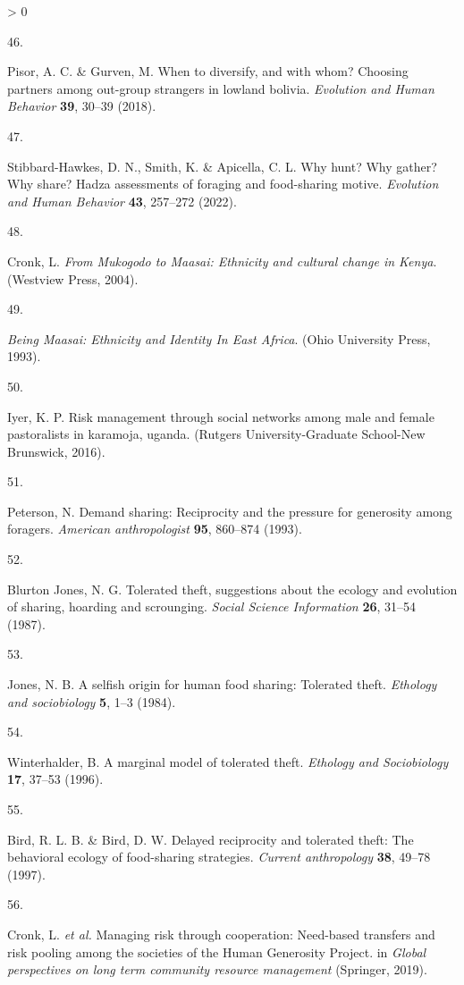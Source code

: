 \documentclass[
]{article}
\newlength{\cslhangindent}
\newlength{\csllabelwidth}
\newenvironment{CSLReferences}[2] %
 {%
  \setlength{\parindent}{0pt}
  \ifodd #1 \everypar{\setlength{\hangindent}{\cslhangindent}}\ignorespaces\fi
  \ifnum #2 > 0
  \setlength{\parskip}{#2\baselineskip}
  \fi
 }%
 {}
\newcommand{\CSLLeftMargin}[1]{\parbox[t]{\csllabelwidth}{#1}}
\newcommand{\CSLRightInline}[1]{\parbox[t]{\linewidth - \csllabelwidth}{#1}\break}
\begin{document}
\begin{CSLReferences}{0}{0}
\leavevmode\hypertarget{ref-pisor2018diversify}{}%
\CSLLeftMargin{46. }
\CSLRightInline{Pisor, A. C. \& Gurven, M. When to diversify, and with whom? Choosing partners among out-group strangers in lowland bolivia. \emph{Evolution and Human Behavior} \textbf{39}, 30--39 (2018).}

\leavevmode\hypertarget{ref-stibbard2022hunt}{}%
\CSLLeftMargin{47. }
\CSLRightInline{Stibbard-Hawkes, D. N., Smith, K. \& Apicella, C. L. Why hunt? Why gather? Why share? Hadza assessments of foraging and food-sharing motive. \emph{Evolution and Human Behavior} \textbf{43}, 257--272 (2022).}

\leavevmode\hypertarget{ref-cronkMukogodoMaasaiEthnicity2004}{}%
\CSLLeftMargin{48. }
\CSLRightInline{Cronk, L. \emph{From {Mukogodo} to {Maasai}: Ethnicity and cultural change in {Kenya}}. ({Westview Press}, 2004).}

\leavevmode\hypertarget{ref-spearBeingMaasaiEthnicity1993a}{}%
\CSLLeftMargin{49. }
\CSLRightInline{\emph{Being {Maasai}: {Ethnicity} and {Identity In East Africa}}. ({Ohio University Press}, 1993).}

\leavevmode\hypertarget{ref-iyer2016risk}{}%
\CSLLeftMargin{50. }
\CSLRightInline{Iyer, K. P. Risk management through social networks among male and female pastoralists in karamoja, uganda. (Rutgers University-Graduate School-New Brunswick, 2016).}

\leavevmode\hypertarget{ref-peterson1993demand}{}%
\CSLLeftMargin{51. }
\CSLRightInline{Peterson, N. Demand sharing: Reciprocity and the pressure for generosity among foragers. \emph{American anthropologist} \textbf{95}, 860--874 (1993).}

\leavevmode\hypertarget{ref-blurton1987tolerated}{}%
\CSLLeftMargin{52. }
\CSLRightInline{Blurton Jones, N. G. Tolerated theft, suggestions about the ecology and evolution of sharing, hoarding and scrounging. \emph{Social Science Information} \textbf{26}, 31--54 (1987).}

\leavevmode\hypertarget{ref-jones1984selfish}{}%
\CSLLeftMargin{53. }
\CSLRightInline{Jones, N. B. A selfish origin for human food sharing: Tolerated theft. \emph{Ethology and sociobiology} \textbf{5}, 1--3 (1984).}

\leavevmode\hypertarget{ref-winterhalder1996marginal}{}%
\CSLLeftMargin{54. }
\CSLRightInline{Winterhalder, B. A marginal model of tolerated theft. \emph{Ethology and Sociobiology} \textbf{17}, 37--53 (1996).}

\leavevmode\hypertarget{ref-bird1997delayed}{}%
\CSLLeftMargin{55. }
\CSLRightInline{Bird, R. L. B. \& Bird, D. W. Delayed reciprocity and tolerated theft: The behavioral ecology of food-sharing strategies. \emph{Current anthropology} \textbf{38}, 49--78 (1997).}

\leavevmode\hypertarget{ref-cronkManagingRiskCooperationinpress}{}%
\CSLLeftMargin{56. }
\CSLRightInline{Cronk, L. \emph{et al.} Managing risk through cooperation: {Need}-based transfers and risk pooling among the societies of the {Human Generosity Project}. in \emph{Global perspectives on long term community resource management} ({Springer}, 2019).}

\end{CSLReferences}
\end{document}

